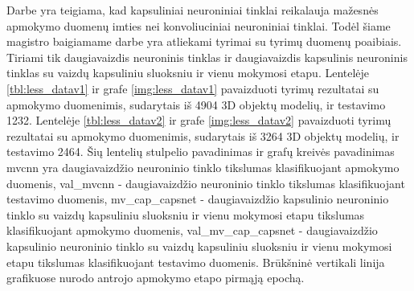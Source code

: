Darbe \cite{capsNet} yra teigiama, kad kapsuliniai neuroniniai tinklai reikalauja mažesnės apmokymo duomenų imties nei konvoliuciniai neuroniniai tinklai. Todėl šiame magistro baigiamame darbe yra atliekami tyrimai su tyrimų duomenų poaibiais. Tiriami tik daugiavaizdis neuroninis tinklas ir daugiavaizdis kapsulinis neuroninis tinklas su vaizdų kapsuliniu sluoksniu ir vienu mokymosi etapu. Lentelėje \ref{tbl:less_datav1} ir grafe \ref{img:less_datav1} pavaizduoti tyrimų rezultatai su apmokymo duomenimis, sudarytais iš 4904 3D objektų modelių, ir testavimo 1232. Lentelėje \ref{tbl:less_datav2} ir grafe \ref{img:less_datav2} pavaizduoti tyrimų rezultatai su apmokymo duomenimis, sudarytais iš 3264 3D objektų modelių, ir testavimo 2464. Šių lentelių stulpelio pavadinimas ir grafų kreivės pavadinimas mvcnn yra daugiavaizdžio neuroninio tinklo tikslumas klasifikuojant apmokymo duomenis, val\_mvcnn - daugiavaizdžio neuroninio tinklo tikslumas klasifikuojant testavimo duomenis, mv\_cap\_capsnet - daugiavaizdžio kapsulinio neuroninio tinklo su vaizdų kapsuliniu sluoksniu ir vienu mokymosi etapu tikslumas klasifikuojant apmokymo duomenis, val\_mv\_cap\_capsnet - daugiavaizdžio kapsulinio neuroninio tinklo su vaizdų kapsuliniu sluoksniu ir vienu mokymosi etapu tikslumas klasifikuojant testavimo duomenis. Brūkšninė vertikali linija grafikuose nurodo antrojo apmokymo etapo pirmąją epochą.

